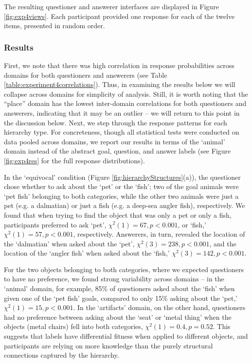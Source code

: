 \documentclass[12pt, floatsintext, jou]{apa6}
\begin{document}
The resulting questioner and answerer interfaces are displayed in Figure \ref{fig:exp4views}.  Each participant provided one response for each of the twelve items, presented in random order. 

\subsubsection{Results}

First, we note that there was high correlation in response probabilities across domains for both questioners and answerers (see Table \ref{table:experiment4correlations}). Thus, in examining the results below we will collapse across domains for simplicity of analysis. Still, it is worth noting that the ``place'' domain has the lowest inter-domain correlations for both questioners and answerers, indicating that it may be an outlier -- we will return to this point in the discussion below.  Next, we step through the response patterns for each hierarchy type. For concreteness, though all statistical tests were conducted on data pooled across domains, we report our results in terms of the `animal' domain instead of the abstract goal, question, and answer labels (see Figure \ref{fig:exp4res} for the full response distributions).

In the `equivocal' condition (Figure \ref{fig:hierarchyStructures}(a)), the questioner chose whether to ask about the `pet' or the `fish'; two of the goal animals were `pet fish' belonging to both categories, while the other two animals were just a pet (e.g. a dalmatian) or just a fish (e.g. a deep-sea angler fish), respectively. We found that when trying to find the object that was only a pet or only a fish, participants preferred to ask `pet', $\chi^2(1) = 67, p < 0.001$, or `fish,' $\chi^2(1) = 57, p < 0.001$, respectively. Answerers, in turn, revealed the location of the `dalmatian' when asked about the `pet', $\chi^2(3) = 238, p < 0.001$, and the location of the `angler fish' when asked about the `fish,' $\chi^2(3) = 142, p < 0.001$. 

For the two objects belonging to both categories, where we expected questioners to have no preference, we found strong variability across domains -- in the `animal' domain, for example, 85\% of questioners asked about the `fish' when given one of the `pet fish' goals, compared to only 15\% asking about the `pet,' $\chi^2(1) = 15, p < 0.001$. In the `artifacts' domain, on the other hand, questioners had no preference between asking about the `seat' or `metal thing' when the objects (metal chairs) fell into both categories, $\chi^2(1) = 0.4, p = 0.52$. This suggests that labels have differential fitness when applied to different objects, and participants are relying on more knowledge than the purely structural connections captured by the hierarchy. 
\end{document}
